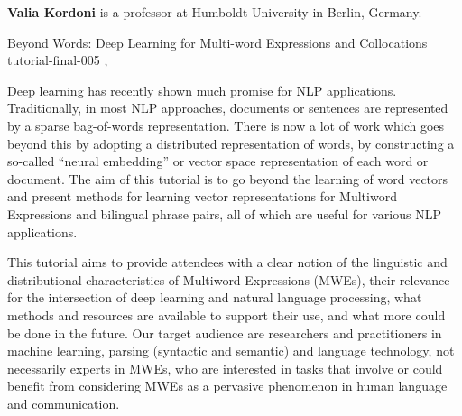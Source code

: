 \begin{bio}
  {\bfseries Valia Kordoni} is a professor at Humboldt University in Berlin,
  Germany. 

\end{bio}

\begin{tutorial}
  {Beyond Words: Deep Learning for Multi-word Expressions and Collocations}
  {tutorial-final-005}
  {\daydateyear, \tutorialafternoontime}
  {\TutLocE}

Deep learning has recently shown much promise for NLP applications.
Traditionally, in most NLP approaches, documents or sentences are represented
by a sparse bag-of-words representation. There is now a lot of work which goes
beyond this by adopting a distributed representation of words, by constructing
a so-called ``neural embedding'' or vector space representation of each word or
document. The aim of this tutorial is to go beyond the learning of word
vectors and present methods for learning vector representations for Multiword
Expressions and bilingual phrase pairs, all of which are useful for various NLP
applications.

This tutorial aims to provide attendees with a clear notion of the linguistic
and distributional characteristics of Multiword Expressions (MWEs), their
relevance for the intersection of deep learning and natural language
processing, what methods and resources are available to support their use, and
what more could be done in the future. Our target audience are researchers and
practitioners in machine learning, parsing (syntactic and semantic) and
language technology, not necessarily experts in MWEs, who are interested in
tasks that involve or could benefit from considering MWEs as a pervasive
phenomenon in human language and communication.

\end{tutorial}